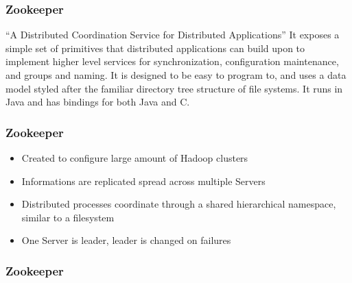 \documentclass[serif,mathserif]{beamer}
\begin{document}


\begin{frame}
\frametitle{Zookeeper}
``A Distributed Coordination Service for Distributed Applications''
It exposes a simple set of primitives that distributed applications can build
upon to implement higher level services for synchronization, configuration maintenance,
and groups and naming. It is designed to be easy to program to, and uses a data model
styled after the familiar directory tree structure of file systems. It runs in Java and
has bindings for both Java and C.

\end{frame}

\begin{frame}
\frametitle{Zookeeper}
\begin{itemize}
  \item Created to configure large amount of Hadoop clusters
  \item Informations are replicated spread across multiple Servers
  \item Distributed processes coordinate through a shared hierarchical
  namespace, similar to a filesystem
  \item One Server is leader, leader is changed on failures
\end{itemize}

\end{frame}

\begin{frame}
\frametitle{Zookeeper}
\begin{figure}[t]
\centering
{}
\end{figure}
\end{frame}
\end{document}
